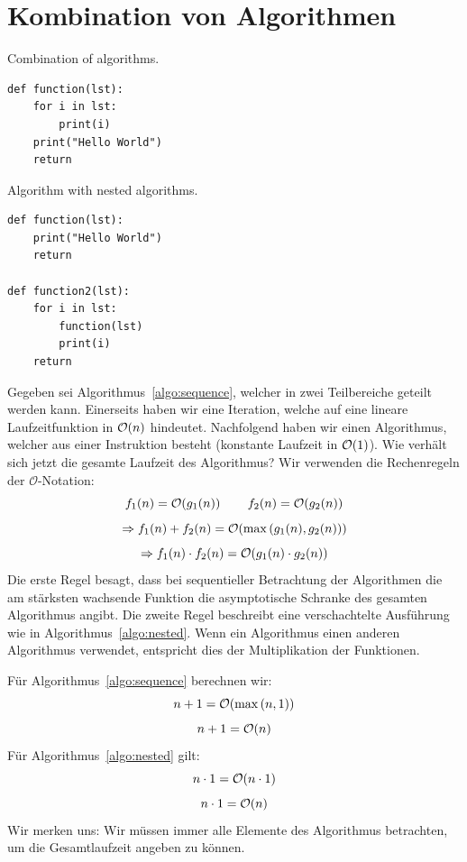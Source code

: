 \section{Kombination von Algorithmen}
%
\begin{algorithm}
\caption{Combination of algorithms.}
\label{algo:sequence}
\begin{lstlisting}
def function(lst):
    for i in lst:
        print(i)
    print("Hello World")
    return
\end{lstlisting}
\end{algorithm}
\begin{algorithm}
\caption{Algorithm with nested algorithms.}
\label{algo:nested}
\begin{lstlisting}
def function(lst):
    print("Hello World")
    return

def function2(lst):
    for i in lst:
        function(lst)
        print(i)
    return
\end{lstlisting}
\end{algorithm}
%
Gegeben sei Algorithmus~\ref{algo:sequence}, welcher in zwei Teilbereiche geteilt werden kann. Einerseits haben wir eine Iteration, welche auf eine lineare Laufzeitfunktion in $\mathcal{O}\!\left(n\right)$ hindeutet. Nachfolgend haben wir einen Algorithmus, welcher aus einer Instruktion besteht (konstante Laufzeit in $\mathcal{O}\!\left(1\right)$). Wie verhält sich jetzt die gesamte Laufzeit des Algorithmus? Wir verwenden die Rechenregeln der $\mathcal{O}$-Notation:
%
\[
  f_1(n) = \mathcal{O}\!\left(g_1(n)\right)  \qquad  f_2(n) = \mathcal{O}\!\left(g_2(n)\right)
\] \[
  \Rightarrow f_1(n) + f_2(n) = \mathcal{O}\!\left(\max{\left(g_1(n), g_2(n)\right)}\right)
\] \[
  \Rightarrow f_1(n) \cdot f_2(n) = \mathcal{O}\!\left(g_1(n) \cdot g_2(n)\right)
\]
%
Die erste Regel besagt, dass bei sequentieller Betrachtung der Algorithmen die am stärksten wachsende Funktion die asymptotische Schranke des gesamten Algorithmus angibt. Die zweite Regel beschreibt eine verschachtelte Ausführung wie in Algorithmus~\ref{algo:nested}. Wenn ein Algorithmus einen anderen Algorithmus verwendet, entspricht dies der Multiplikation der Funktionen.

Für Algorithmus~\ref{algo:sequence} berechnen wir:
%
\[
  n + 1 = \mathcal{O}\!\left(\max\left(n, 1\right)\right)
\] \[
  n + 1 = \mathcal{O}\!\left(n\right)
\]
Für Algorithmus~\ref{algo:nested} gilt:
\[
  n \cdot 1 = \mathcal{O}\!\left(n \cdot 1\right)
\] \[
  n \cdot 1 = \mathcal{O}\!\left(n\right)
\]
%
Wir merken uns: Wir müssen immer alle Elemente des Algorithmus betrachten, um die Gesamtlaufzeit angeben zu können.
%
